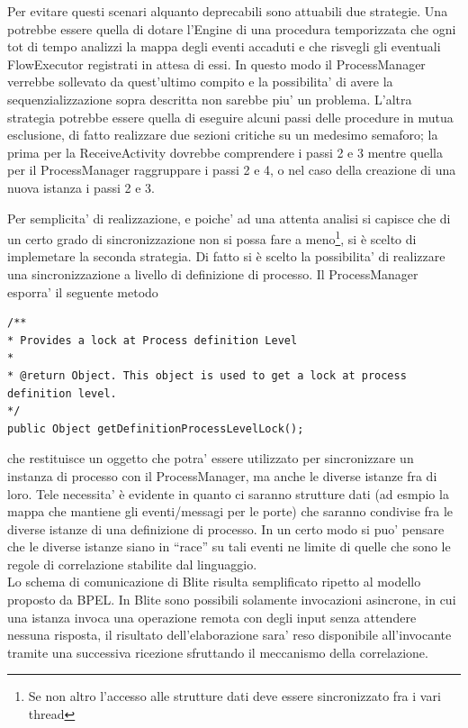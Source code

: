 Per evitare questi scenari alquanto deprecabili sono attuabili due strategie.
Una potrebbe essere quella di dotare l'Engine di una procedura temporizzata che
ogni tot di tempo analizzi la mappa degli eventi accaduti e che risvegli
gli eventuali FlowExecutor registrati in attesa di essi. In questo modo il
ProcessManager verrebbe sollevato da quest'ultimo compito e la possibilita' di
avere la sequenzializzazione sopra descritta non sarebbe piu' un problema.
L'altra strategia potrebbe essere quella di eseguire alcuni passi delle
procedure in mutua esclusione, di fatto realizzare due sezioni critiche su un
medesimo semaforo; la prima per la ReceiveActivity dovrebbe comprendere i passi
2 e 3 mentre quella per il ProcessManager raggruppare i passi 2 e 4, o nel caso
della creazione di una nuova istanza i passi 2 e 3.

Per semplicita' di realizzazione, e poiche' ad una attenta analisi si capisce
che di un certo grado di sincronizzazione non si possa fare a meno\footnote{Se
non altro l'accesso alle strutture dati deve essere sincronizzato fra i vari
thread}, si \`e scelto di implemetare la seconda strategia. Di fatto si \`e
scelto la possibilita' di realizzare una sincronizzazione a livello di
definizione di processo. Il ProcessManager esporra' il seguente metodo

\begin{lstlisting}
/**
* Provides a lock at Process definition Level
* 
* @return Object. This object is used to get a lock at process definition level.
*/
public Object getDefinitionProcessLevelLock();
\end{lstlisting}

che restituisce un oggetto che potra' essere utilizzato per sincronizzare un
instanza di processo con il ProcessManager, ma anche le diverse istanze fra di
loro. Tele necessita' \`e evidente in quanto ci saranno strutture dati (ad
esmpio la mappa che mantiene gli eventi/messagi per le porte) che saranno
condivise fra le diverse istanze di una definizione di processo. In un certo
modo si puo' pensare che le diverse istanze siano in ``race'' su tali eventi
ne limite di quelle che sono le regole di correlazione stabilite dal linguaggio.
\\

Lo schema di comunicazione di Blite risulta semplificato ripetto al modello
proposto da BPEL. In Blite sono possibili solamente invocazioni asincrone, in
cui una istanza invoca una operazione remota con degli input senza attendere
nessuna risposta, il risultato dell'elaborazione sara' reso disponibile
all'invocante tramite una successiva ricezione sfruttando il meccanismo della
correlazione. 

